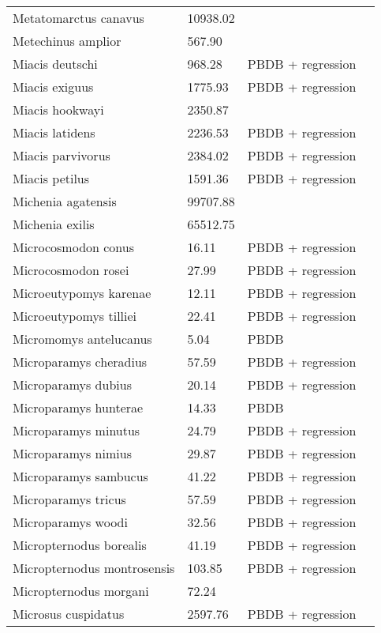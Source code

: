 \documentclass{article}
\begin{document}
\begin{center}
\begin{longtable}{p{} p{} p{} p{}}
    Metatomarctus canavus & 10938.02 & \cite{Tomiya2013} &  \\ 
    Metechinus amplior & 567.90 & \cite{Tedford1994} &  \\ 
    Miacis deutschi & 968.28 & PBDB + regression &  \\ 
    Miacis exiguus & 1775.93 & PBDB + regression &  \\ 
    Miacis hookwayi & 2350.87 & \cite{Patton1973} &  \\ 
    Miacis latidens & 2236.53 & PBDB + regression &  \\ 
    Miacis parvivorus & 2384.02 & PBDB + regression &  \\ 
    Miacis petilus & 1591.36 & PBDB + regression &  \\ 
    Michenia agatensis & 99707.88 & \cite{Tomiya2013} &  \\ 
    Michenia exilis & 65512.75 & \cite{Tomiya2013} &  \\ 
    Microcosmodon conus & 16.11 & PBDB + regression &  \\ 
    Microcosmodon rosei & 27.99 & PBDB + regression &  \\ 
    Microeutypomys karenae & 12.11 & PBDB + regression &  \\ 
    Microeutypomys tilliei & 22.41 & PBDB + regression &  \\ 
    Micromomys antelucanus & 5.04 & PBDB &  \\ 
    Microparamys cheradius & 57.59 & PBDB + regression &  \\ 
    Microparamys dubius & 20.14 & PBDB + regression &  \\ 
    Microparamys hunterae & 14.33 & PBDB &  \\ 
    Microparamys minutus & 24.79 & PBDB + regression &  \\ 
    Microparamys nimius & 29.87 & PBDB + regression &  \\ 
    Microparamys sambucus & 41.22 & PBDB + regression &  \\ 
    Microparamys tricus & 57.59 & PBDB + regression &  \\ 
    Microparamys woodi & 32.56 & PBDB + regression &  \\ 
    Micropternodus borealis & 41.19 & PBDB + regression &  \\ 
    Micropternodus montrosensis & 103.85 & PBDB + regression &  \\ 
    Micropternodus morgani & 72.24 & \cite{Tomiya2013} &  \\ 
    Microsus cuspidatus & 2597.76 & PBDB + regression &  \\ 

\end{longtable}
\end{center}
\end{document}

